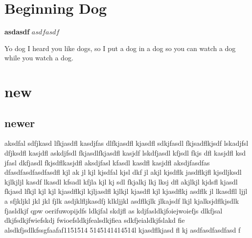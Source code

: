 \documentclass{article}
\begin{document}
\section{Beginning Dog}
\textbf{asdasdf}
$asdfasdf$

Yo dog I heard you like dogs, so I put a dog in a dog so you can watch a dog while you watch a dog. \section{new}
\subsection{newer}
aksdfal sdfjkasd lfkjasdfl kasdjfas dlfkjasdfl kjasdfl sdkjfasdl fkjsadflkjsdf lskadjfsl dfjksdfl kasjdfl askdjfsdl fkjasdlfkjasdfl kasjdf lskdfjasdl kfjsdl fkjs
dfl kasjdfl ksd
jfasl dkfjasdl fkjsdflkasjdfl aksdjfasl kfasdl kasdfl kasjdfl 
aksdjfasdfas
dfasdfasdfasdfasdfl kjl ak
jl kjl kjsdfal kjsl dkf
jl akjl  kjsdflk
jasdflkjfl kjsdljksdl kjlkjljl
 kasdf lkasdl kfsadl kfjla kjl kj
sdl fkjalkj lkj lksj
dfl akjlkjl kjdsfl kjasdl fkjasd
lfkjl kjl kjl
kjasdflkjl
kjljasdfl kjlkjl
 kjasdfl kjl kjasdflkj
asdflk jl lkasdfll  ljjl a
sfjkljkl jkl jkl fjlk asdjklfljkasdfj
klkljjkl asdflkjlk jlkajsdf
lkjl kjalksjdflkjsdlk
fjasldkjf
qpw
oerifuwopijdfs
ldkjfal  skdjfl as
kdjfasldkjfoiejwoiefjs
dlkfjsal dkjfsdkjfwiefskdj
fwioefsldkjfealsdkjfiea
sdkfjeialdkjfslakd  fie
alsdkfjsdlkfssgfaafaf1151514
5145141414514l kjasdflkjasd
fl kj asdfasdfasdfasd
f
\end{document}
